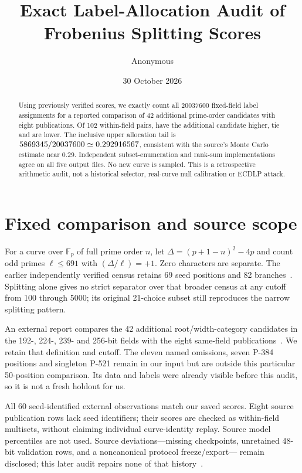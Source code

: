 \documentclass[10pt]{article}
\title{Exact Label-Allocation Audit of Frobenius Splitting Scores}
\author{Anonymous}\date{30 October 2026}
\makeatletter
\renewcommand{\maketitle}{\begin{center}{\Large\bfseries\@title\par}\vspace{5pt}\@author\qquad\@date\end{center}}
\makeatother
\begin{document}
\maketitle
\begin{abstract}
Using previously verified scores, we exactly count all 20037600 fixed-field
label assignments for a reported comparison of 42 additional prime-order
candidates with eight publications. Of 102 within-field pairs, \HigherCount{}
have the additional candidate higher, \TieCount{} tie and \LowerCount{} are
lower. The inclusive upper allocation tail is
$5869345/20037600\simeq0.292916567$, consistent with the
source's Monte Carlo estimate near 0.29. Independent subset-enumeration and
rank-sum implementations agree on all five output files. No new curve is
sampled. This is a retrospective arithmetic audit, not a historical selector,
real-curve null calibration or ECDLP attack.
\end{abstract}

\section{Fixed comparison and source scope}
For a curve over $\mathbb F_p$ of full prime order $n$, let
$\Delta=(p+1-n)^2-4p$ and count odd primes $\ell\le691$ with
$(\Delta/\ell)=+1$. Zero characters are separate. The earlier independently
verified census retains 69 seed positions and 82 branches~\cite{census}.
Splitting alone gives no strict separator over that broader census at any
cutoff from 100 through 5000; its original 21-choice subset still reproduces
the narrow splitting pattern.

An external report compares the 42 additional root/width-category candidates
in the 192-, 224-, 239- and 256-bit fields with the eight same-field
publications~\cite{source}. We retain that definition and cutoff. The eleven
named omissions, seven P-384 positions and singleton P-521 remain in our input
but are outside this particular 50-position comparison. Its data and labels
were already visible before this audit, so it is not a fresh holdout for us.

All 60 seed-identified external observations match our saved scores. Eight
source publication rows lack seed identifiers; their scores are checked as
within-field multisets, without claiming individual curve-identity replay.
Source model percentiles are not used. Source deviations---missing checkpoints,
unretained 48-bit validation rows, and a noncanonical protocol freeze/export---
remain disclosed; this later audit repairs none of that history~\cite{deviations}.
\end{document}
